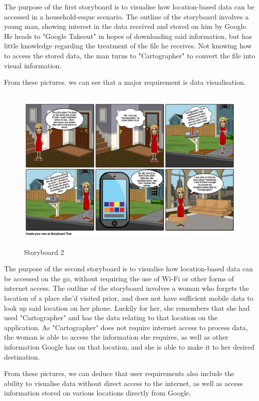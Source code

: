 \documentclass[12p]{article}
\begin{document}
	The purpose of the first storyboard is to visualise how location-based data can be accessed in a household-esque scenario. The outline of the storyboard involves a young man, showing interest in the data received and stored on him by Google. He heads to "Google Takeout" in hopes of downloading said information, but has little knowledge regarding the treatment of the file he receives. Not knowing how to access the stored data, the man turns to "Cartographer" to convert the file into visual information.
	
	From these pictures, we can see that a major requirement is data visualisation.
	
	\begin{figure}[ht]
	    \center
        \includegraphics[height=8cm,keepaspectratio]{pics/story2.png}
        \caption{Storyboard 2}
    \end{figure}
	
	The purpose of the second storyboard is to visualise how location-based data can be accessed on the go, without requiring the use of Wi-Fi or other forms of internet access. The outline of the storyboard involves a woman who forgets the location of a place she'd visited prior, and does not have sufficient mobile data to look up said location on her phone. Luckily for her, she remembers that she had used "Cartographer" and has the data relating to that location on the application. As "Cartographer" does not require internet access to process data, the woman is able to access the information she requires, as well as other information Google has on that location, and she is able to make it to her desired destination.
	
	From these pictures, we can deduce that user requirements also include the ability to visualise data without direct access to the internet, as well as access information stored on various locations directly from Google.
	
\end{document}
